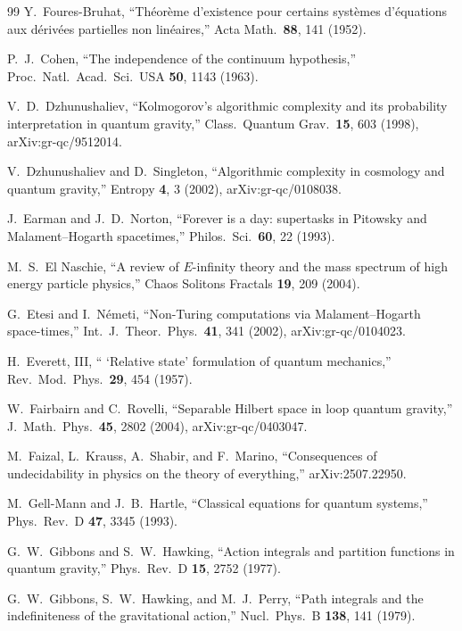 \documentclass[11pt,a4paper]{article}
\theoremstyle{plain}
\theoremstyle{definition}
\theoremstyle{remark}
\begin{document}
\begin{thebibliography}{99}
Y.~Foures-Bruhat,
``Th\'eor\`eme d'existence pour certains syst\`emes d'\'equations aux d\'eriv\'ees partielles non lin\'eaires,''
Acta Math.\ \textbf{88}, 141 (1952).

P.~J.~Cohen,
``The independence of the continuum hypothesis,''
Proc.\ Natl.\ Acad.\ Sci.\ USA \textbf{50}, 1143 (1963).

V.~D.~Dzhunushaliev,
``Kolmogorov's algorithmic complexity and its probability interpretation in quantum gravity,''
Class.\ Quantum Grav.\ \textbf{15}, 603 (1998),
arXiv:gr-qc/9512014.

V.~Dzhunushaliev and D.~Singleton,
``Algorithmic complexity in cosmology and quantum gravity,''
Entropy \textbf{4}, 3 (2002),
arXiv:gr-qc/0108038.

J.~Earman and J.~D.~Norton,
``Forever is a day: supertasks in Pitowsky and Malament--Hogarth spacetimes,''
Philos.\ Sci.\ \textbf{60}, 22 (1993).

M.~S.~El Naschie,
``A review of $E$-infinity theory and the mass spectrum of high energy particle physics,''
Chaos Solitons Fractals \textbf{19}, 209 (2004).

G.~Etesi and I.~N\'emeti,
``Non-Turing computations via Malament--Hogarth space-times,''
Int.\ J.\ Theor.\ Phys.\ \textbf{41}, 341 (2002),
arXiv:gr-qc/0104023.

H.~Everett, III,
`` `Relative state' formulation of quantum mechanics,''
Rev.\ Mod.\ Phys.\ \textbf{29}, 454 (1957).

W.~Fairbairn and C.~Rovelli,
``Separable Hilbert space in loop quantum gravity,''
J.\ Math.\ Phys.\ \textbf{45}, 2802 (2004),
arXiv:gr-qc/0403047.

M.~Faizal, L.~Krauss, A.~Shabir, and F.~Marino,
``Consequences of undecidability in physics on the theory of everything,''
arXiv:2507.22950.

M.~Gell-Mann and J.~B.~Hartle,
``Classical equations for quantum systems,''
Phys.\ Rev.\ D \textbf{47}, 3345 (1993).

G.~W.~Gibbons and S.~W.~Hawking,
``Action integrals and partition functions in quantum gravity,''
Phys.\ Rev.\ D \textbf{15}, 2752 (1977).

G.~W.~Gibbons, S.~W.~Hawking, and M.~J.~Perry,
``Path integrals and the indefiniteness of the gravitational action,''
Nucl.\ Phys.\ B \textbf{138}, 141 (1979).


\end{thebibliography}
\end{document}
